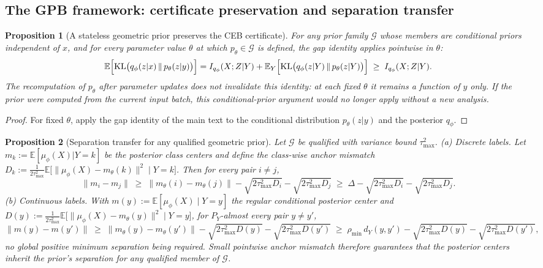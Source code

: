 \documentclass{article}
\theoremstyle{plain}
\newtheorem{proposition}{Proposition}[section]
\theoremstyle{remark}
\newcommand{\E}{\mathbb{E}}
\DeclareMathOperator{\KL}{KL}
\begin{document}
\subsection{The GPB framework: certificate preservation and separation transfer}

\begin{proposition}[A stateless geometric prior preserves the CEB certificate]
\label{prop:opb-certificate}
For any prior family $\mathcal{G}$ whose members are conditional priors independent
of $x$, and for every parameter value $\theta$ at which $p_\theta \in \mathcal{G}$ is
defined, the gap identity applies pointwise in $\theta$:
\begin{equation}
\E\Bigl[ \KL\bigl(q_\phi(z|x) \,\|\, p_\theta(z|y)\bigr) \Bigr]
= I_{q_\phi}(X;Z|Y)
+ \E_Y\Bigl[ \KL\bigl(q_\phi(z|Y) \,\|\, p_\theta(z|Y)\bigr) \Bigr]
\;\ge\; I_{q_\phi}(X;Z|Y) .
\end{equation}
The recomputation of $p_\theta$ after parameter updates does not invalidate this
identity: at each fixed $\theta$ it remains a function of $y$ only. If the prior were
computed from the current input batch, this conditional-prior argument would no
longer apply without a new analysis.
\end{proposition}

\begin{proof}
For fixed $\theta$, apply the gap identity of the main text to the conditional
distribution $p_\theta(z|y)$ and the posterior $q_\phi$.
\end{proof}

\begin{proposition}[Separation transfer for any qualified geometric prior]
\label{prop:pgib-separation}
Let $\mathcal{G}$ be qualified with variance bound $\tau^2_{\max}$.
\emph{(a) Discrete labels.} Let $m_k := \E[\mu_\phi(X) | Y = k]$ be the posterior
class centers and define the class-wise anchor mismatch
$D_k := \frac{1}{2\tau^2_{\max}}\E\bigl[ \|\mu_\phi(X) - m_\theta(k)\|^2 \mid Y = k \bigr]$.
Then for every pair $i \ne j$,
\begin{equation}
\|m_i - m_j\| \;\ge\; \|m_\theta(i) - m_\theta(j)\|
- \sqrt{2\tau^2_{\max} D_i} - \sqrt{2\tau^2_{\max} D_j}
\;\ge\; \Delta - \sqrt{2\tau^2_{\max} D_i} - \sqrt{2\tau^2_{\max} D_j} .
\end{equation}
\emph{(b) Continuous labels.} With $m(y) := \E[\mu_\phi(X) \mid Y = y]$ the regular
conditional posterior center and
$D(y) := \frac{1}{2\tau^2_{\max}}\E\bigl[ \|\mu_\phi(X) - m_\theta(y)\|^2 \mid Y = y \bigr]$,
for $P_Y$-almost every pair $y \ne y'$,
\begin{equation}
\|m(y) - m(y')\| \;\ge\; \|m_\theta(y) - m_\theta(y')\|
- \sqrt{2\tau^2_{\max} D(y)} - \sqrt{2\tau^2_{\max} D(y')}
\;\ge\; \rho_{\min}\, d_Y(y, y') - \sqrt{2\tau^2_{\max} D(y)} - \sqrt{2\tau^2_{\max} D(y')} ,
\end{equation}
no global positive minimum separation being required. Small pointwise anchor mismatch
therefore guarantees that the posterior centers inherit the prior's separation for
\emph{any} qualified member of $\mathcal{G}$.
\end{proposition}
\end{document}

